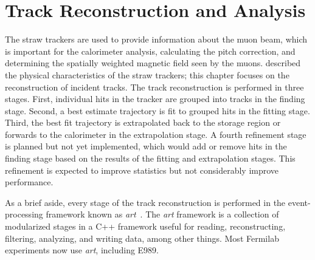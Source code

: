 
\thispagestyle{myheadings}

\graphicspath{{Body/Figures/TrackingFigures/}{Body/Figures/TrackingFigures/OriginalDocumentationPlots/}{Body/Figures/TrackingFigures/OriginalDocumentationPlots/PlanePlots/}{Body/Figures/TrackingFigures/OriginalDocumentationPlots/PullPlots/}{Body/Figures/TrackingFigures/OriginalDocumentationPlots/Residuals/}{Body/Figures/TrackingFigures/eLossAndMaterial/}{Body/Figures/TrackingFigures/CoordSys/}{Body/Figures/TrackingFigures/TrackerPics/}{Body/Figures/TrackingFigures/Field/}{Body/Figures/TrackingFigures/TrackingFlow/}{Body/Figures/TrackingFigures/LeftRight/}{Body/Figures/TrackingFigures/Misc/}{Body/Figures/TrackingFigures/Extrapolation/}{Body/Figures/TrackingFigures/Tracks/}{Body/Figures/TrackingFigures/BeamMeasurements/}{Body/Figures/TrackingFigures/MCDataComparison/}{Body/Figures/TrackingFigures/VacuumPlots/}{Body/Figures/TrackingFigures/UpdatedDocumentationPlots/Images/}{Body/Figures/TrackingFigures/VacuumPlots/}{Body/Figures/TrackingFigures/Feb19DataPlots/Images/}}

\chapter{Track Reconstruction and Analysis}
\label{chapter:TrackReconstruction}

The straw trackers are used to provide information about the muon beam, which is important for the calorimeter \wa analysis, calculating the \wa pitch correction, and determining the spatially weighted magnetic field seen by the muons.  described the physical characteristics of the straw trackers; this chapter focuses on the reconstruction of incident tracks. The track reconstruction is performed in three stages. First, individual hits in the tracker are grouped into tracks in the finding stage. Second, a best estimate trajectory is fit to grouped hits in the fitting stage. Third, the best fit trajectory is extrapolated back to the storage region or forwards to the calorimeter in the extrapolation stage. A fourth refinement stage is planned but not yet implemented, which would add or remove hits in the finding stage based on the results of the fitting and extrapolation stages. This refinement is expected to improve statistics but not considerably improve performance. 

As a brief aside, every stage of the track reconstruction is performed in the event-processing framework known as \textit{art}~\cite{art}. The \textit{art} framework is a collection of modularized stages in a C++ framework useful for reading, reconstructing, filtering, analyzing, and writing data, among other things. Most Fermilab experiments now use \textit{art}, including E989.


